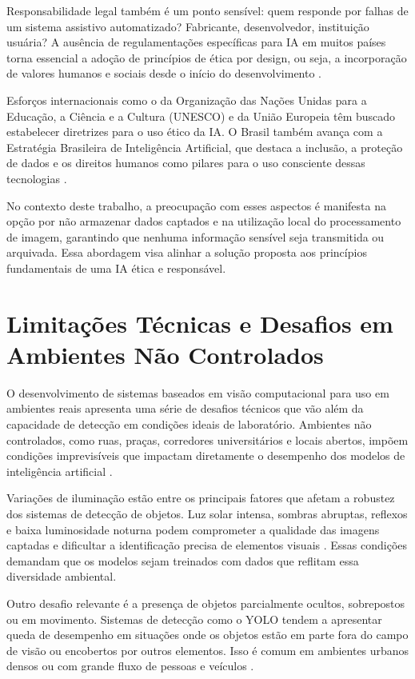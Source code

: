 Responsabilidade legal também é um ponto sensível: quem responde por falhas de um sistema assistivo automatizado? Fabricante, desenvolvedor, instituição usuária? A ausência de regulamentações específicas para IA em muitos países torna essencial a adoção de princípios de ética por design, ou seja, a incorporação de valores humanos e sociais desde o início do desenvolvimento \cite{Dignum2019}.

Esforços internacionais como o da Organização das Nações Unidas para a Educação, a Ciência e a Cultura (UNESCO) e da União Europeia têm buscado estabelecer diretrizes para o uso ético da IA. O Brasil também avança com a Estratégia Brasileira de Inteligência Artificial, que destaca a inclusão, a proteção de dados e os direitos humanos como pilares para o uso consciente dessas tecnologias \cite{MCTI2021}.

No contexto deste trabalho, a preocupação com esses aspectos é manifesta na opção por não armazenar dados captados e na utilização local do processamento de imagem, garantindo que nenhuma informação sensível seja transmitida ou arquivada. Essa abordagem visa alinhar a solução proposta aos princípios fundamentais de uma IA ética e responsável.

\section{Limitações Técnicas e Desafios em Ambientes Não Controlados}

O desenvolvimento de sistemas baseados em visão computacional para uso em ambientes reais apresenta uma série de desafios técnicos que vão além da capacidade de detecção em condições ideais de laboratório. Ambientes não controlados, como ruas, praças, corredores universitários e locais abertos, impõem condições imprevisíveis que impactam diretamente o desempenho dos modelos de inteligência artificial \cite{Canziani2016}.

Variações de iluminação estão entre os principais fatores que afetam a robustez dos sistemas de detecção de objetos. Luz solar intensa, sombras abruptas, reflexos e baixa luminosidade noturna podem comprometer a qualidade das imagens captadas e dificultar a identificação precisa de elementos visuais \cite{Li2022}. Essas condições demandam que os modelos sejam treinados com dados que reflitam essa diversidade ambiental.

Outro desafio relevante é a presença de objetos parcialmente ocultos, sobrepostos ou em movimento. Sistemas de detecção como o YOLO tendem a apresentar queda de desempenho em situações onde os objetos estão em parte fora do campo de visão ou encobertos por outros elementos. Isso é comum em ambientes urbanos densos ou com grande fluxo de pessoas e veículos \cite{Zhao2019}.

